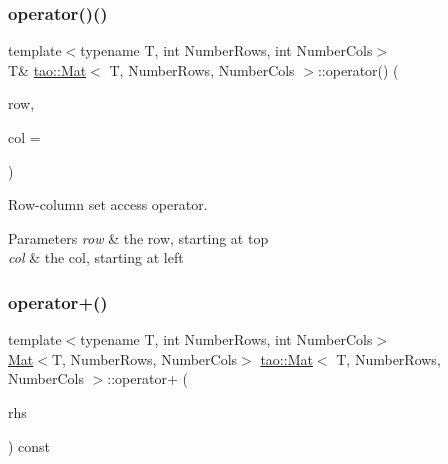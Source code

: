 \subsubsection{\texorpdfstring{operator()()}{operator()()}\hspace{0.1cm}{\footnotesize\ttfamily [2/2]}}
{\footnotesize\ttfamily template$<$typename T, int Number\+Rows, int Number\+Cols$>$ \\
T\& \mbox{\hyperlink{classtao_1_1_mat}{tao\+::\+Mat}}$<$ T, Number\+Rows, Number\+Cols $>$\+::operator() (\begin{DoxyParamCaption}\item[{int}]{row,  }\item[{int}]{col = {} }\end{DoxyParamCaption})\hspace{0.3cm}{\ttfamily [inline]}}



Row-\/column set access operator. 


\begin{DoxyParams}{Parameters}
{\em row} & the row, starting at top \\
\hline
{\em col} & the col, starting at left \\
\hline
\end{DoxyParams}
\mbox{\label{classtao_1_1_mat_a558aaf77a7c7e3feba292932bed7166f}} 
\subsubsection{\texorpdfstring{operator+()}{operator+()}}
{\footnotesize\ttfamily template$<$typename T, int Number\+Rows, int Number\+Cols$>$ \\
\mbox{\hyperlink{classtao_1_1_mat}{Mat}}$<$T, Number\+Rows, Number\+Cols$>$ \mbox{\hyperlink{classtao_1_1_mat}{tao\+::\+Mat}}$<$ T, Number\+Rows, Number\+Cols $>$\+::operator+ (\begin{DoxyParamCaption}\item[{const \mbox{\hyperlink{classtao_1_1_mat}{Mat}}$<$ T, Number\+Rows, Number\+Cols $>$ \&}]{rhs }\end{DoxyParamCaption}) const\hspace{0.3cm}{\ttfamily [inline]}}




